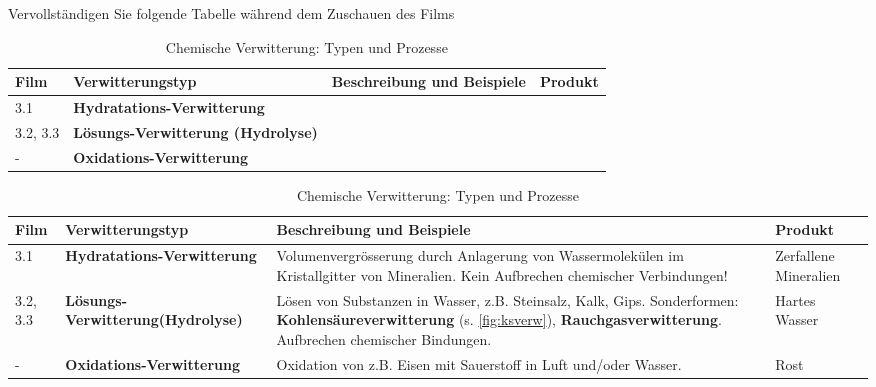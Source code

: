 \begin{myexercise}
Vervollständigen Sie folgende Tabelle während dem Zuschauen des Films
\begin{table}[H]
\centering
\begin{tabular}{@{}l|p{3cm}||p{6cm}|p{3cm}@{}}
\toprule
\tiny Film &\textbf{Verwitterungstyp} & \textbf{Beschreibung und Beispiele} & \textbf{Produkt} \\
\midrule\midrule
\tiny 3.1 & \textbf{Hydratations-Verwitterung} & &  \\[50pt] \midrule
\tiny 3.2, 3.3 & \textbf{Lösungs-Verwitterung \newline (Hydrolyse)} & & \\[50pt] \midrule
\tiny - &\textbf{Oxidations-Verwitterung} & & \\[50pt] \bottomrule

\end{tabular}
\caption{Chemische Verwitterung: Typen und Prozesse}
\end{table}
\begin{myanswer}
\begin{table}[H]
\centering
\begin{tabular}{@{}l|p{3cm}||p{6cm}|p{3cm}@{}}
\toprule
\small
\tiny Film &\textbf{Verwitterungstyp} & \textbf{Beschreibung und Beispiele} & \textbf{Produkt} \\
\midrule\midrule
\tiny 3.1 & \textbf{Hydratations-Verwitterung} & Volumenvergrösserung durch Anlagerung von Wassermolekülen im Kristallgitter von Mineralien. Kein Aufbrechen chemischer Verbindungen! & Zerfallene Mineralien \\\midrule
\tiny 3.2, 3.3 &\textbf{Lösungs-Verwitterung\newline (Hydrolyse)} & Lösen von Substanzen in Wasser, z.B. Steinsalz, Kalk, Gips. \newline Sonderformen: \textbf{Kohlensäureverwitterung} (s. \cref{fig:ksverw}), \textbf{Rauchgasverwitterung}. Aufbrechen chemischer Bindungen. & Hartes Wasser \\\midrule
\tiny - &\textbf{Oxidations-Verwitterung} & Oxidation von z.B. Eisen mit Sauerstoff in Luft und/oder Wasser. & Rost \\\bottomrule

\end{tabular}
\caption{Chemische Verwitterung: Typen und Prozesse}
\end{table}
\end{myanswer}
\end{myexercise}

